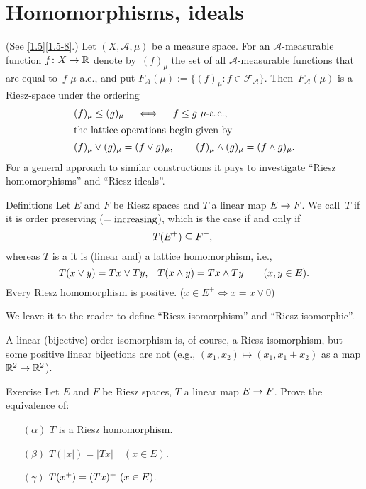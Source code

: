 \documentclass[main.tex]{subfiles}
\begin{document}
\section{Homomorphisms, ideals}
%
%
\begin{psec}{}
\label{2.1}
(See \ref{1.5}\ref{1.5-8}.) 
Let $(X,\mathcal A, \mu)$ be a measure space.
For an $\mathcal A$-measurable 
function $f\colon X\rightarrow \mathbb{R}$
denote by~$(f)_\mu$
the set of all $\mathcal A$-measurable functions
that are equal to~$f$ $\mu$-a.e.,
and put 
$F_{\mathcal A}(\mu):=\{(f)_\mu\colon f\in\mathcal{F}_{\mathcal A}\}$.
Then~$F_{\mathcal A}(\mu)$ 
is a Riesz-space
under the ordering
\begin{align*}
& (f)_\mu \leq (g)_\mu \quad \iff \quad f\leq g\ \mu\htam{-a.e.,} \\
\intertext{%
the lattice operations begin given by}%
& (f)_\mu \vee (g)_\mu = (f\vee g)_\mu \htam{, }
  \qquad (f)_\mu \wedge (g)_\mu = (f\wedge g)_\mu
\htam{.}
\end{align*}
For a general approach to similar constructions
it pays to investigate ``Riesz homomorphisms'' 
and ``Riesz ideals''.
\end{psec}
%
%
\begin{psec}{Definitions}
\label{2.2}
Let $E$ and $F$ be Riesz spaces 
and $T$ a linear map $E\rightarrow F$.
We call~$T$  
if it is order preserving ($=\text{increasing}$),
which is the case if and only if
\begin{equation*}
T(E^+) \subseteq F^+\text{, }
\end{equation*}
whereas $T$ is a  
it is (linear and) a 
lattice homomorphism, i.e.,
\begin{equation*}
T(x\vee y) = Tx \vee Ty\text{,}
\quad T(x\wedge y)=Tx\wedge Ty
\qquad (x,y\in E)\text{.}
\end{equation*}
Every Riesz homomorphism is positive. 
($x\in E^+\iff x=x\vee 0$)

We leave it to the reader to define ``Riesz isomorphism''
and ``Riesz isomorphic''.

A linear (bijective) order isomorphism is,
of course,
a Riesz isomorphism,
but some positive linear bijections are not
(e.g., $(x_1,x_2)\mapsto(x_1,x_1+x_2)$ as a map
$\mathbb{R}^2\rightarrow\mathbb{R}^2$).
\end{psec}
%
%
\begin{psec}{Exercise}
\label{2.3}
Let $E$ and $F$ be Riesz spaces,
$T$ a linear map $E\rightarrow F$.
Prove the equivalence of:
\begin{enumerate}
\item[$(\alpha)$]  \label{2.3-alpha}
$T$ is a Riesz homomorphism.
%
\item[$(\beta)$]  \label{2.3-beta}
$T(|x|)=|Tx| \quad (x\in E)$.
%
\item[$(\gamma)$]  \label{2.3-gamma}
$T(x^+) = \lsub{(Tx)^+}{(Tx)} \quad (x\in E)$.
\end{enumerate}
\end{psec}
\end{document}
